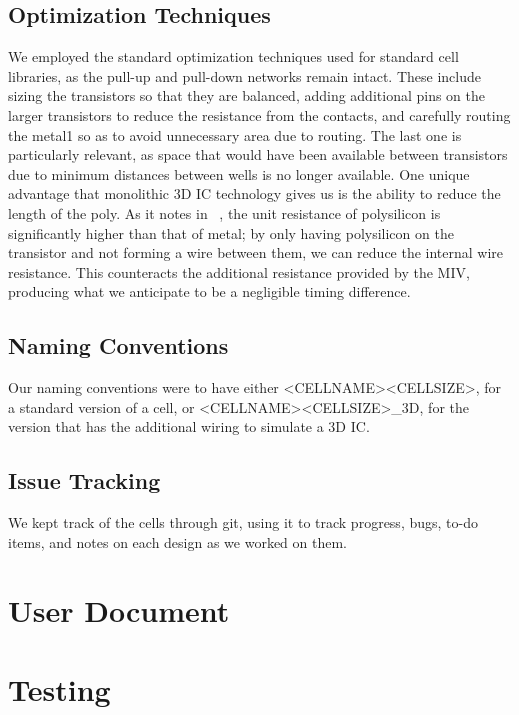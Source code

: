\documentclass{article}
\begin{document}
\subsection{Optimization Techniques} We employed the standard optimization techniques used for standard cell libraries, as the pull-up and pull-down networks remain intact. These include sizing the transistors so that they are balanced, adding additional pins on the larger transistors to reduce the resistance from the contacts, and carefully routing the metal1 so as to avoid unnecessary area due to routing. The last one is particularly relevant, as space that would have been available between transistors due to minimum distances between wells is no longer available. One unique advantage that monolithic 3D IC technology gives us is the ability to reduce the length of the poly. As it notes in ~\cite{ULTRA}, the unit resistance of polysilicon is significantly higher than that of metal; by only having polysilicon on the transistor and not forming a wire between them, we can reduce the internal wire resistance. This counteracts the additional resistance provided by the MIV, producing what we anticipate to be a negligible timing difference.  
\subsection{Naming Conventions} Our naming conventions were to have either \textless CELLNAME\textgreater \textless CELLSIZE\textgreater, for a standard version of a cell, or \textless CELLNAME\textgreater \textless CELLSIZE\textgreater\_3D, for the version that has the additional wiring to simulate a 3D IC. 
\subsection{Issue Tracking} We kept track of the cells through git, using it to track progress, bugs, to-do items, and notes on each design as we worked on them. 


\section{User Document}

\section{Testing}
\end{document}
